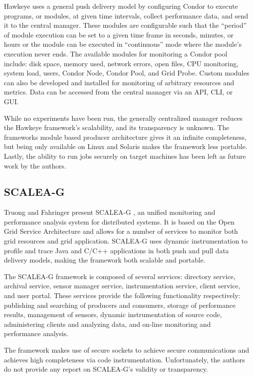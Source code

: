 Hawkeye uses a general push delivery model by configuring Condor to execute programs, or modules, at given time
intervals, collect performance data, and send it to the central manager. These modules are configurable such that the
``period'' of module execution can be set to a given time frame in seconds, minutes, or hours or the module can be
executed in ``continuous'' mode where the module's execution never ends. The available modules for monitoring a Condor
pool include: disk space, memory used, network errors, open files, CPU monitoring, system load, users, Condor Node,
Condor Pool, and Grid Probe. Custom modules can also be developed and installed for monitoring of arbitrary resources
and metrics. Data can be accessed from the central manager via an API, CLI, or GUI.

While no experiments have been run, the generally centralized manager reduces the Hawkeye framework's scalability, and
its transparency is unknown. The frameworks module based producer architecture gives it an infinite completeness, but
being only available on Linux and Solaris makes the framework less portable. Lastly, the ability to run jobs securely on
target machines has been left as future work by the authors.

\subsection{SCALEA-G}

Truong and Fahringer present SCALEA-G \cite{truong2004}, an unified monitoring and performance analysis system for
distributed systems. It is based on the Open Grid Service Architecture \cite{foster2002} and allows for a number of
services to monitor both grid resources and grid application. SCALEA-G uses dynamic instrumentation to profile and trace
Java and C/C++ applications in both push and pull data delivery models, making the framework both scalable and portable.

The SCALEA-G framework is composed of several services: directory service, archival service, sensor manager service,
instrumentation service, client service, and user portal. These services provide the following functionality
respectively: publishing and searching of producers and consumers, storage of performance results, management of
sensors, dynamic instrumentation of source code, administering clients and analyzing data, and on-line monitoring and
performance analysis.

The framework makes use of secure sockets to achieve secure communications and achieves high completeness via code
instrumentation. Unfortunately, the authors do not provide any report on SCALEA-G's validity or transparency.

